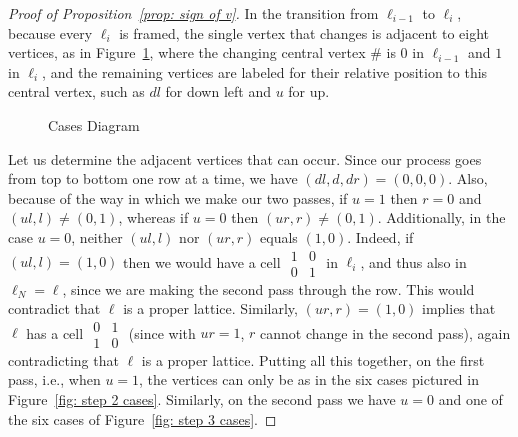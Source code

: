 \documentclass[12pt]{article}
\theoremstyle{plain}
\theoremstyle{remark}
\theoremstyle{definition}
\theoremstyle{remark}
\theoremstyle{definition}
\newcommand{\cell}[4]{ \draw[thick] ( #1 , #2 ) rectangle ( #3 , #4 );}
\newcommand{\lablvertex}[3]{\node[shape=circle,draw=none,fill=white, inner sep=2pt,minimum size=5pt] (A) at ( #1 , #2 ) {#3};}
\begin{document}
\begin{proof}[Proof of Proposition~\ref{prop: sign of v}]
In the transition from $\ell_{i-1}$ to $\ell_{i}$, because every $\ell_{i}$ is framed, the single vertex that changes is adjacent to eight vertices, as in Figure~\ref{fig: cases diagram}, where the changing central vertex $\#$ is $0$ in $\ell_{i-1}$ and $1$ in $\ell_{i}$, and the remaining vertices are labeled for their relative position to this central vertex, such as $dl$ for down left and $u$
for up.
\begin{figure}[h!]
\begin{center}
\end{center}
\caption{Cases Diagram}
\label{fig: cases diagram}
\end{figure}

Let us determine the adjacent vertices that can occur. Since our process goes from top to bottom one row at a time, we have $\left(dl,d,dr\right)=\left(0,0,0\right)$. Also, because of the way in which we make our two passes, if $u=1$ then $r=0$ and $\left(ul,l\right)\neq\left(0,1\right)$, whereas if $u=0$ then $\left(ur,r\right)\neq\left(0,1\right)$. Additionally, in the case $u=0$, neither $\left(ul,l\right)$ nor $\left(ur,r\right)$ equals $\left(1,0\right)$. Indeed, if $\left(ul,l\right)=\left(1,0\right)$ then we would have a cell $\begin{smallmatrix} 1 & 0 \\ 0 & 1 \end{smallmatrix}$ in $\ell_{i}$, and thus also in $\ell_{N}=\ell$, since we are making the second pass through the row. This would contradict that $\ell$ is a proper lattice. Similarly, $\left(ur,r\right)=\left(1,0\right)$ implies that $\ell$ has a cell $\begin{smallmatrix} 0 & 1 \\ 1 & 0 \end{smallmatrix}$ (since with $ur=1$, $r$ cannot change in the second pass), again contradicting that $\ell$ is a proper lattice. Putting all this together, on the first pass, i.e., when $u=1$, the vertices can only be as in the six cases pictured in Figure~\ref{fig: step 2 cases}. Similarly, on the second pass we have $u=0$ and one of the six cases of Figure~\ref{fig: step 3 cases}.


\end{proof}
\end{document}
